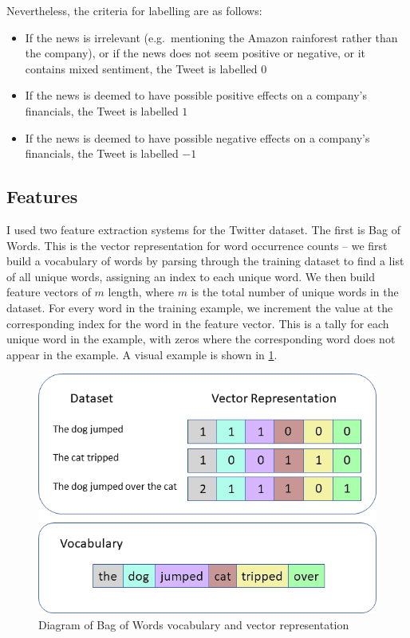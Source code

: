 \documentclass[12pt,a4paper,twoside,openright]{report}
\begin{document}
Nevertheless, the criteria for labelling are as follows:

\begin{itemize}
\item
If the news is irrelevant (e.g.\ mentioning the Amazon rainforest rather than the company),
or if the news does not seem positive or negative, or it contains mixed sentiment, the Tweet is labelled $0$

\item
If the news is deemed to have possible positive effects on a company's financials, the Tweet is labelled $1$

\item
If the news is deemed to have possible negative effects on a company's financials, the Tweet is labelled $-1$
\end{itemize}

\subsection{Features}
\label{sec:impSentiFeat}
I used two feature extraction systems for the Twitter dataset. The first is
Bag of Words. This is the vector representation for word occurrence counts --
we first build a vocabulary of words by parsing through the training dataset to find a list of all unique words,
assigning an index to each unique word. We then build feature vectors of $m$ length, where $m$ is the
total number of unique words in the dataset. For every word in the training example, we
increment the value at the corresponding index for the word in the feature vector. This is
a tally for each unique word in the example, with zeros where the
corresponding word does not appear in the example. A visual example is shown in \cref{fig:bow}.

\begin{figure}[H]
\centering
\vspace{10pt}
\includegraphics[width=\textwidth]{BoW.png}
\caption{Diagram of Bag of Words vocabulary and vector representation}
\label{fig:bow}
\end{figure}
\end{document}

